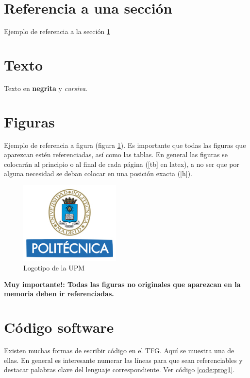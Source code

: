 \section{Referencia a una sección}
\label{sec:refsec}

Ejemplo de referencia a la sección \ref{sec:refsec}

\section{Texto}

Texto en \textbf{negrita} y \textit{cursiva}.

\section{Figuras}

Ejemplo de referencia a figura (figura \ref{fig:logo_upm}). Es importante que todas las figuras que aparezcan estén referenciadas, así como las tablas. En general las figuras se colocarán al principio o al final de cada página ([tb] en latex), a no ser que por alguna necesidad se deban colocar en una posición exacta ([h]).

\begin{figure}[tb]
\centering
\includegraphics[width=0.45\textwidth]{figuras/Logo_UPM.jpg}   
\caption{Logotipo de la UPM}
\label{fig:logo_upm}
\end{figure}

\textbf{Muy importante!: Todas las figuras no originales que aparezcan en la memoria deben ir referenciadas.}


\section{Código software}

Existen muchas formas de escribir código en el TFG. Aquí se muestra una de ellas. En general es interesante numerar las líneas para que sean referenciables y destacar palabras clave del lenguaje correspondiente. Ver código \ref{code:prog1}.

